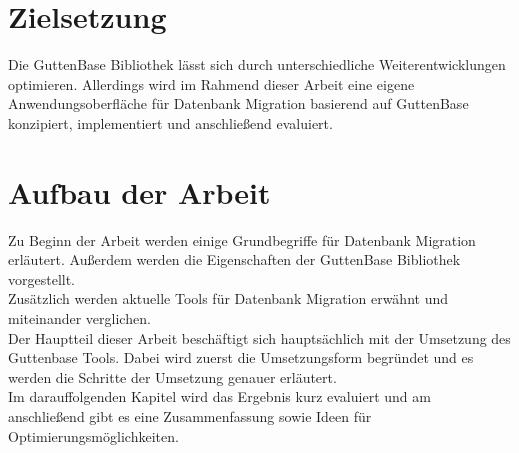 \section{Zielsetzung}
Die GuttenBase Bibliothek lässt sich durch unterschiedliche Weiterentwicklungen optimieren. Allerdings wird im Rahmend dieser Arbeit eine eigene Anwendungsoberfläche für Datenbank Migration basierend auf GuttenBase konzipiert, implementiert und anschließend evaluiert. 
\section{Aufbau der Arbeit}
Zu Beginn der Arbeit werden einige Grundbegriffe für Datenbank Migration erläutert. Außerdem werden die Eigenschaften der GuttenBase Bibliothek vorgestellt.\\
Zusätzlich werden aktuelle Tools für Datenbank Migration erwähnt und miteinander verglichen.\\
Der Hauptteil dieser Arbeit beschäftigt sich hauptsächlich mit der Umsetzung des Guttenbase Tools. Dabei wird zuerst die Umsetzungsform begründet und es werden die Schritte der Umsetzung genauer erläutert.\\
Im darauffolgenden Kapitel wird das Ergebnis kurz evaluiert und am anschließend gibt es eine Zusammenfassung sowie Ideen für Optimierungsmöglichkeiten.